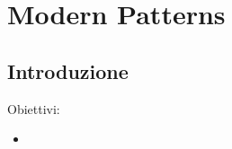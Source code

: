 \documentclass{article}
\begin{document}
\pagestyle{empty}
\section*{Modern Patterns}
\large

\subsection*{Introduzione}
\large
Obiettivi:
\begin{itemize}
    \renewcommand{\labelitemi}{-}
    \itemsep0em
    \item 
\end{itemize}
\end{document}
